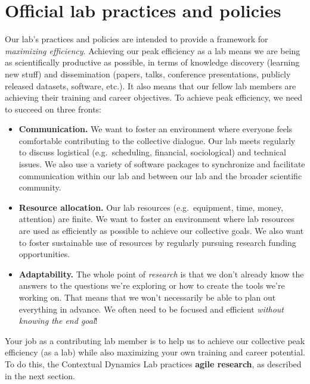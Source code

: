 \documentclass{tufte-book} %
\begin{document}
\chapter{Official lab practices and policies}\label{ch:policy}
Our lab's practices and policies are intended to provide a framework
for \textit{maximizing efficiency}.  Achieving our peak efficiency as
a lab means we are being as scientifically productive as possible, in
terms of knowledge discovery (learning new stuff) and dissemination
(papers, talks, conference presentations, publicly released datasets,
software, etc.). It also means that our fellow lab members are
achieving their training and career objectives.  To achieve peak
efficiency, we need to succeed on three fronts:
\begin{itemize}
\item \textbf{Communication.}  We want to foster an environment where
  everyone feels comfortable contributing to the collective dialogue.
  Our lab meets regularly to discuss logistical (e.g.\ scheduling, financial,
  sociological) and technical issues.  We also use a variety of
  software packages to synchronize and facilitate communication within
  our lab and between our lab and the broader scientific community.
\item \textbf{Resource allocation.}   Our lab resources (e.g.\
  equipment, time, money, attention) are finite.  We want to foster an
  environment where lab resources are used as efficiently as possible
  to achieve our collective goals.  We also want to foster
  sustainable use of resources by regularly pursuing research funding opportunities.
\item \textbf{Adaptability.}  The whole point of \textit{research} is that we
  don't already know the answers to the questions we're exploring or
  how to create the tools we're working on.  That means that we won't
  necessarily be able to plan out everything in advance.  We often need to
  be focused and efficient \textit{without knowing the end goal}!
\end{itemize}
Your job as a contributing lab member is to help us to achieve our
collective peak efficiency (as a lab) while also maximizing your own
training and career potential.  To do this, the Contextual Dynamics
Lab practices \textbf{agile research}, as described in the next section.
\end{document}
